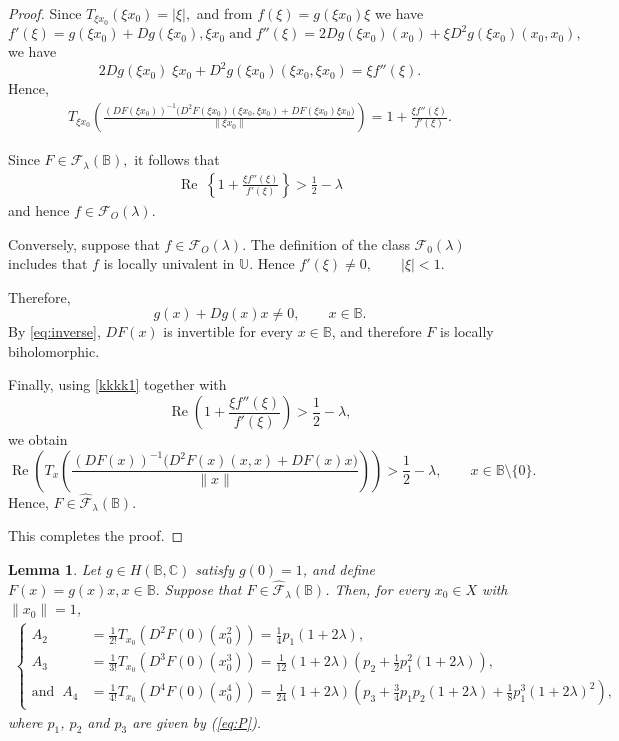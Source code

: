 \documentclass[11pt, reqno]{amsart}
\newtheorem{lem}{Lemma}[section]
\numberwithin{equation}{section}
\newcommand{\beas}{\begin{eqnarray*}}
\newcommand{\eeas}{\end{eqnarray*}}
\newcommand{\bea}{\begin{eqnarray}}
\newcommand{\eea}{\end{eqnarray}}
\begin{document}
\begin{proof}
Since $T_{\xi x_0}(\xi x_0)=|\xi|,$ and from $f(\xi)=g(\xi x_{0})\xi$ we have 
\[
f'(\xi)=g(\xi x_0)+Dg(\xi x_0),\xi x_0\;\text{and}\;f''(\xi)=2Dg(\xi x_0)(x_0)+\xi D^2g(\xi x_0)(x_0,x_0),
\]
we have
\[
2Dg(\xi x_0)\;\xi x_0+D^2g(\xi x_0)(\xi x_0,\xi x_0)=\xi f''(\xi).
\]
Hence,
\bea\label{kkkk1}
T_{\xi x_0}\left(\frac{(DF(\xi x_0))^{-1}\bigl(D^2F(\xi x_0)(\xi x_0,\xi x_0)+DF(\xi x_0)\xi x_0\bigr)}{\|\xi x_0\|}
\right)
=1+\frac{\xi f''(\xi)}{f'(\xi)}.
\eea

Since $F\in\widehat{\mathcal{F}}_{\lambda}(\mathbb{B}),$
it follows that
\beas\label{kkkk1}
\operatorname{Re}\;\left\{1+\frac{\xi f''(\xi)}{f'(\xi)}\right\}>\frac{1}{2}-\lambda
\eeas
and hence $f\in\mathcal{F}_{O}(\lambda).$\\

\medskip

Conversely, suppose that $f\in\mathcal{F}_{O}(\lambda).$ The definition of the class \(\mathcal F_0(\lambda)\) includes that \(f\) is locally univalent in \(\mathbb U\). Hence $f'(\xi)\neq0,\qquad |\xi|<1.$

Therefore,
\[g(x)+Dg(x)x\neq0,
\qquad x\in\mathbb{B}.
\]
By \eqref{eq:inverse}, $DF(x)$ is invertible for every $x\in\mathbb{B}$, and therefore $F$ is locally biholomorphic.

Finally, using \eqref{kkkk1} together with
\[
\operatorname{Re} \left(1+\frac{\xi f''(\xi)}{f'(\xi)}\right)>\frac{1}{2}-\lambda,
\]
we obtain
\[
\operatorname{Re}\left(T_x\left(\frac{(DF(x))^{-1}\bigl(D^2F(x)(x,x)+DF(x)x\bigr)}{\|x\|}\right)\right)>\frac{1}{2}-\lambda, \qquad x\in\mathbb{B}\setminus\{0\}.
\]
Hence, $F\in\widehat{\mathcal{F}}_{\lambda}(\mathbb{B}).$

This completes the proof.
\end{proof}
\begin{lem}\label{L3}  Let $g\in H(\mathbb{B},\mathbb{C})$ satisfy $g(0)=1$, and define $F(x)=g(x)x, x\in\mathbb{B}.$ Suppose that $F\in\widehat{\mathcal{F}}_{\lambda}(\mathbb{B})$. Then, for every
$x_{0}\in X$ with $\|x_{0}\|=1$,
\bea\label{A234}
\begin{cases} A_{2}
&=
\frac{1}{2!}
T_{x_{0}}
\left(
D^{2}F(0)(x_{0}^{2})
\right)
=\frac{1}{4}p_1(1+2\lambda),\\
A_{3}
&=
\frac{1}{3!}
T_{x_{0}}
\left(
D^{3}F(0)(x_{0}^{3})
\right)
=\frac{1}{12}(1+2\lambda)\left(p_2+\frac{1}{2}p_1^2(1+2\lambda)\right),
\\
\text{and}\;\; 
A_{4}
&=
\frac{1}{4!}T_{x_{0}}\left(D^{4}F(0)(x_{0}^{4})\right)=\frac{1}{24}(1+2\lambda)\left(p_3+\frac{3}{4}p_1p_2(1+2\lambda)+\frac{1}{8}p_1^3(1+2\lambda)^2\right),
\end{cases}
\eea
where $p_1$, $p_2$ and $p_3$ are given by (\ref{eq:P}).

\end{lem}
\end{document}
